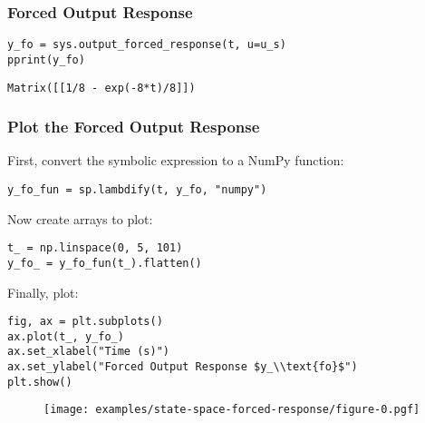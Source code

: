 \label{532e6346}
\subsubsection{Forced Output Response}\label{forced-output-response}

\label{971f95db}
\nointerlineskip\nointerlineskip\begin{verbatim}
y_fo = sys.output_forced_response(t, u=u_s)
pprint(y_fo)
\end{verbatim}

\nointerlineskip\nointerlineskip\begin{verbatim}
Matrix([[1/8 - exp(-8*t)/8]])
\end{verbatim}

\label{f09a6196}
\subsubsection{Plot the Forced Output
Response}\label{plot-the-forced-output-response}

First, convert the symbolic expression to a NumPy function:

\label{c02b557d}
\nointerlineskip\nointerlineskip\begin{verbatim}
y_fo_fun = sp.lambdify(t, y_fo, "numpy")
\end{verbatim}

\label{9d64b860}
Now create arrays to plot:

\label{be886d32}
\nointerlineskip\nointerlineskip\begin{verbatim}
t_ = np.linspace(0, 5, 101)
y_fo_ = y_fo_fun(t_).flatten()
\end{verbatim}

\label{f269af9f}
Finally, plot:

\label{cfaff726}
\nointerlineskip\nointerlineskip\begin{verbatim}
fig, ax = plt.subplots()
ax.plot(t_, y_fo_)
ax.set_xlabel("Time (s)")
ax.set_ylabel("Forced Output Response $y_\\text{fo}$")
plt.show()
\end{verbatim}

\label{6229d772}
\gdef\graphicslist{}%
\begin{figure}[htbp]
\centering
\texttt{[image: examples/state-space-forced-response/figure-0.pgf]}
\caption{}
\label{fig:state-space-forced-response-figure-0}
\end{figure}
